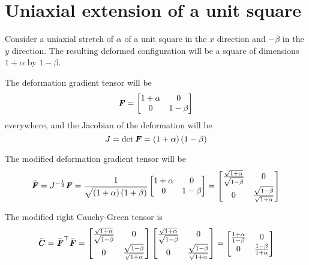 \clearemptydoublepage

\section{Uniaxial extension of a unit square}

Consider a uniaxial stretch of $\alpha$ of a unit square in the $x$ direction
and $-\beta$ in the $y$ direction. The resulting deformed configuration will
be a square of dimensions $1+\alpha$ by $1-\beta$.

The deformation gradient tensor will be
\begin{equation}
  \boldsymbol{\mathit{F}}= \begin{bmatrix}
    1+\alpha & 0  \\
    0 & 1-\beta
  \end{bmatrix}
\end{equation}
everywhere, and the Jacobian of the deformation will be 
\begin{equation}
  J = \det \boldsymbol{\mathit{F}}=\left( 1+\alpha \right)\left( 1-\beta \right)
\end{equation}

The modified deformation gradient tensor will be
\begin{equation}
  \bar{\boldsymbol{\mathit{F}}}=J^{-\frac{1}{2}}\boldsymbol{\mathit{F}}=\frac{1}{\sqrt{\left( 1+\alpha \right)\left( 1+\beta \right)}}\begin{bmatrix}
    1+\alpha & 0  \\
    0 & 1-\beta
  \end{bmatrix}=\begin{bmatrix}
    \frac{\sqrt{1+\alpha}}{\sqrt{1-\beta}} & 0  \\
    0 & \frac{\sqrt{1-\beta}}{\sqrt{1+\alpha}}
  \end{bmatrix}
\end{equation}

The modified right Cauchy-Green tensor is
\begin{equation}
  \bar{\boldsymbol{\mathit{C}}} =  {\bar{\boldsymbol{\mathit{F}}}}^{ \top } \bar{\boldsymbol{\mathit{F}}} = \begin{bmatrix}
    \frac{\sqrt{1+\alpha}}{\sqrt{1-\beta}} & 0  \\
    0 & \frac{\sqrt{1-\beta}}{\sqrt{1+\alpha}}
  \end{bmatrix} \begin{bmatrix}
    \frac{\sqrt{1+\alpha}}{\sqrt{1-\beta}} & 0  \\
    0 & \frac{\sqrt{1-\beta}}{\sqrt{1+\alpha}}
  \end{bmatrix}=\begin{bmatrix}
    \frac{1+\alpha}{1-\beta} & 0  \\
    0 & \frac{1-\beta}{1+\alpha}
  \end{bmatrix}
\end{equation}

